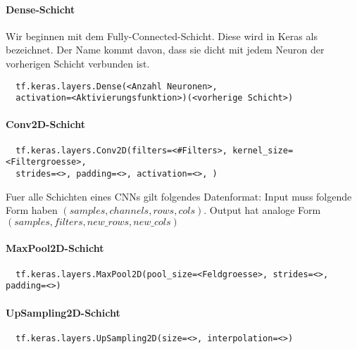\paragraph{Dense-Schicht}
Wir beginnen mit dem Fully-Connected-Schicht. Diese wird in Keras als
 bezeichnet. Der Name kommt davon, dass sie dicht mit jedem Neuron
der vorherigen Schicht verbunden ist.
\begin{verbatim}
  tf.keras.layers.Dense(<Anzahl Neuronen>,
  activation=<Aktivierungsfunktion>)(<vorherige Schicht>)
\end{verbatim}

\paragraph{Conv2D-Schicht}

\begin{verbatim}
  tf.keras.layers.Conv2D(filters=<#Filters>, kernel_size=<Filtergroesse>,
  strides=<>, padding=<>, activation=<>, )
\end{verbatim}
Fuer alle Schichten eines CNNs gilt folgendes Datenformat:
Input muss folgende Form haben $(samples, channels, rows, cols)$. Output hat
analoge Form $(samples, filters, new\_rows, new\_cols)$

\paragraph{MaxPool2D-Schicht}

\begin{verbatim}
  tf.keras.layers.MaxPool2D(pool_size=<Feldgroesse>, strides=<>, padding=<>)
\end{verbatim}


\paragraph{UpSampling2D-Schicht}

\begin{verbatim}
  tf.keras.layers.UpSampling2D(size=<>, interpolation=<>)
\end{verbatim}


